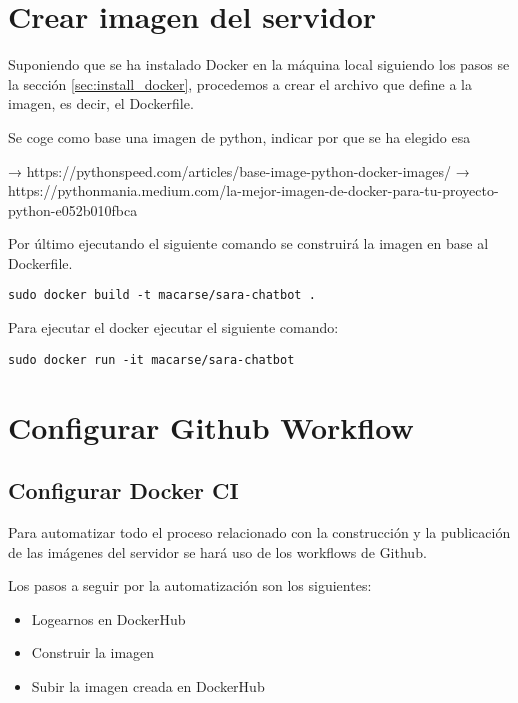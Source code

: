 \section{Crear imagen del servidor}

Suponiendo que se ha instalado Docker en la máquina local siguiendo los pasos se la sección \ref{sec:install_docker}, procedemos a crear el archivo que define a la imagen, es decir, el Dockerfile.

Se coge como base una imagen de python, indicar por que se ha elegido esa 

→ https://pythonspeed.com/articles/base-image-python-docker-images/
→ https://pythonmania.medium.com/la-mejor-imagen-de-docker-para-tu-proyecto-python-e052b010fbca

Por último ejecutando el siguiente comando se construirá la imagen en base al Dockerfile.

\begin{lstlisting}
sudo docker build -t macarse/sara-chatbot .
\end{lstlisting}

Para ejecutar el docker ejecutar el siguiente comando:

\begin{lstlisting}
sudo docker run -it macarse/sara-chatbot
\end{lstlisting}



\section{Configurar Github Workflow}

\subsection{Configurar Docker CI}

Para automatizar todo el proceso relacionado con la construcción y la publicación de las imágenes del servidor se hará uso de los workflows de Github.

Los pasos a seguir por la automatización son los siguientes:

\begin{itemize}
    \item Logearnos en DockerHub
    \item Construir la imagen
    \item Subir la imagen creada en DockerHub
\end{itemize}

